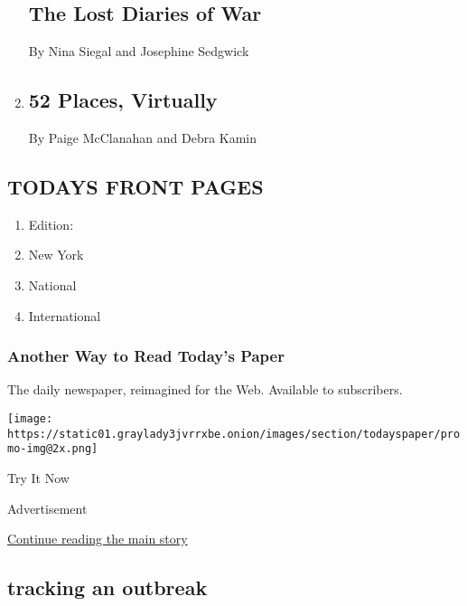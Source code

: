 \begin{enumerate}
  \hypertarget{the-lost-diaries-of-war}{%
  \subsection{The Lost Diaries of War}\label{the-lost-diaries-of-war}}

  By Nina Siegal and Josephine Sedgwick
\item
  \href{/2020/04/14/travel/52-places-to-go-virtual-travel.html}{}

  \hypertarget{52-places-virtually}{%
  \subsection{52 Places, Virtually}\label{52-places-virtually}}

  By Paige McClanahan and Debra Kamin
\end{enumerate}

\hypertarget{todays-front-pages}{%
\subsection{TODAYS FRONT PAGES}\label{todays-front-pages}}

\begin{enumerate}
\def\labelenumi{\arabic{enumi}.}
\tightlist
\item
  Edition:
\item
  New York
\item
  National
\item
  International
\end{enumerate}

\href{http://app.nytimes3xbfgragh.onion/todayspaper}{}

\hypertarget{another-way-to-read-todays-paper}{%
\subsubsection{Another Way to Read Today's
Paper}\label{another-way-to-read-todays-paper}}

The daily newspaper, reimagined for the Web. Available to subscribers.

\texttt{[image: https://static01.graylady3jvrrxbe.onion/images/section/todayspaper/promo-img@2x.png]}

Try It Now

Advertisement

\protect\hyperlink{after-mid1}{Continue reading the main story}

\hypertarget{tracking-an-outbreak}{%
\subsection{tracking an outbreak}\label{tracking-an-outbreak}}

